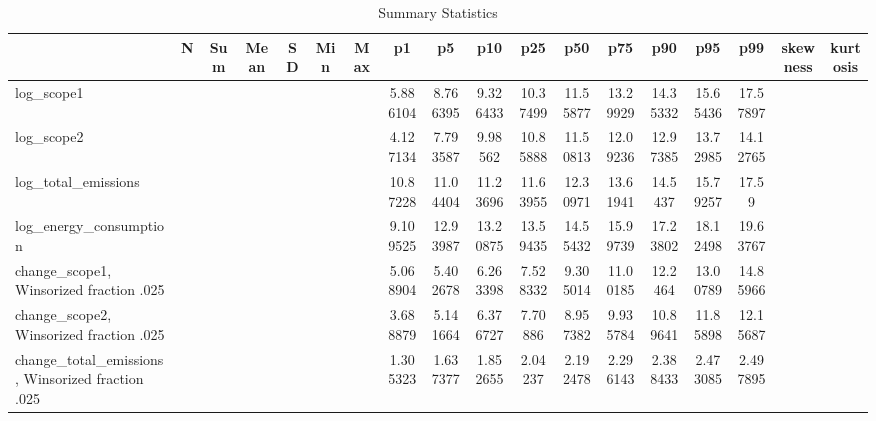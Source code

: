 \begin{table}[htbp]\centering
\def\sym#1{\ifmmode^{#1}\else\(^{#1}\)\fi}
\caption{Summary Statistics \label{summarystats}}
\begin{tabular}{l*{1}{ccccccccccccccccc}}
\toprule
                    &           N&         Sum&        Mean&          SD&         Min&         Max&          p1&          p5&         p10&         p25&         p50&         p75&         p90&         p95&         p99&    skewness&    kurtosis\\
\midrule
log\_scope1          &            &            &            &            &            &            &    5.886104&    8.766395&    9.326433&    10.37499&    11.55877&    13.29929&    14.35332&    15.65436&    17.57897&            &            \\
log\_scope2          &            &            &            &            &            &            &    4.127134&    7.793587&     9.98562&    10.85888&    11.50813&    12.09236&    12.97385&    13.72985&    14.12765&            &            \\
log\_total\_emissions &            &            &            &            &            &            &    10.87228&    11.04404&    11.23696&    11.63955&    12.30971&    13.61941&     14.5437&    15.79257&       17.59&            &            \\
log\_energy\_consumption&            &            &            &            &            &            &    9.109525&    12.93987&    13.20875&    13.59435&    14.55432&    15.99739&    17.23802&    18.12498&    19.63767&            &            \\
change\_scope1, Winsorized fraction .025&            &            &            &            &            &            &    5.068904&    5.402678&    6.263398&    7.528332&    9.305014&    11.00185&     12.2464&    13.00789&    14.85966&            &            \\
change\_scope2, Winsorized fraction .025&            &            &            &            &            &            &    3.688879&    5.141664&    6.376727&     7.70886&    8.957382&    9.935784&    10.89641&    11.85898&    12.15687&            &            \\
change\_total\_emissions, Winsorized fraction .025&            &            &            &            &            &            &    1.305323&    1.637377&    1.852655&     2.04237&    2.192478&    2.296143&    2.388433&    2.473085&    2.497895&            &            \\

\end{tabular}
\end{table}
